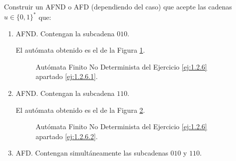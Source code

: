 \begin{ejercicio} \label{ej:1.2.6}
    Construir un AFND o AFD (dependiendo del caso) que acepte las cadenas $u \in \{0, 1\}^*$ que:
    \begin{enumerate}
        \item AFND. Contengan la subcadena $010$. \label{ej:1.2.6.1}
        
        El autómata obtenido es el de la Figura \ref{fig:ej:1.2.6.1}.
        \begin{figure}[H]
            \centering
            \caption{Autómata Finito No Determinista del Ejercicio \ref{ej:1.2.6} apartado \ref{ej:1.2.6.1}.}
            \label{fig:ej:1.2.6.1}
        \end{figure}
        \item AFND. Contengan la subcadena $110$. \label{ej:1.2.6.2}
        
        El autómata obtenido es el de la Figura \ref{fig:ej:1.2.6.2}.
        \begin{figure}[H]
            \centering
            \caption{Autómata Finito No Determinista del Ejercicio \ref{ej:1.2.6} apartado \ref{ej:1.2.6.2}.}
            \label{fig:ej:1.2.6.2}
        \end{figure}
        \item AFD. Contengan simultáneamente las subcadenas $010$ y $110$. \label{ej:1.2.6.3}
    \end{enumerate}
\end{ejercicio}

